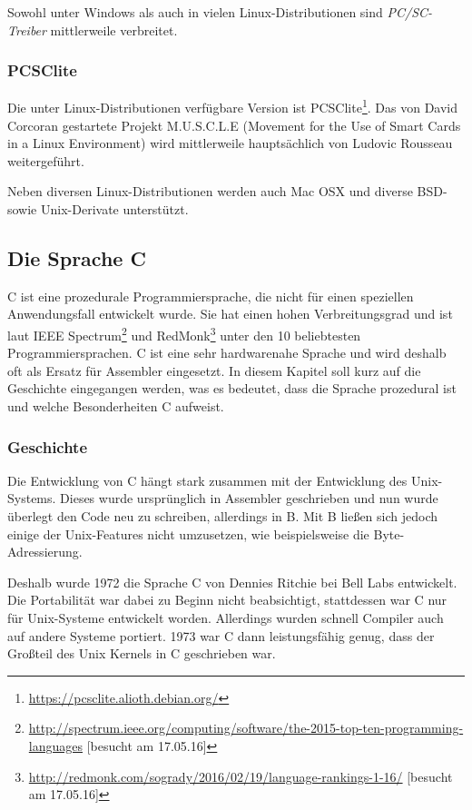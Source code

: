 Sowohl unter Windows als auch in vielen Linux-Distributionen sind
\textit{PC/SC-Treiber} mittlerweile verbreitet.

\subsubsection{PCSClite}
Die unter Linux-Distributionen verfügbare Version ist
PCSClite\footnote{\url{https://pcsclite.alioth.debian.org/}}.
Das von David Corcoran gestartete Projekt M.U.S.C.L.E
(Movement for the Use of Smart Cards in a Linux Environment)
wird mittlerweile hauptsächlich von Ludovic Rousseau
weitergeführt\cite{pcscliteweb}.

Neben diversen Linux-Distributionen werden auch Mac OSX und diverse
BSD- sowie Unix-Derivate unterstützt.

\subsection{Die Sprache C}
 C ist eine prozedurale Programmiersprache, die nicht für einen speziellen
 Anwendungsfall entwickelt wurde. Sie hat einen hohen Verbreitungsgrad
 und ist laut \ac{IEEE} Spectrum\footnote{\url{http://spectrum.ieee.org/computing/software/the-2015-top-ten-programming-languages} [besucht am 17.05.16]}
 und RedMonk\footnote{\url{http://redmonk.com/sogrady/2016/02/19/language-rankings-1-16/} [besucht am 17.05.16]}
 unter den 10 beliebtesten Programmiersprachen. C ist eine sehr hardwarenahe
 Sprache und wird deshalb oft als Ersatz für Assembler eingesetzt. In
 diesem Kapitel soll kurz auf die Geschichte eingegangen werden, was es
 bedeutet, dass die Sprache prozedural ist und welche Besonderheiten C
 aufweist.

 \subsubsection{Geschichte}
  Die Entwicklung von C hängt stark zusammen mit der Entwicklung des Unix-Systems.
  Dieses wurde ursprünglich in Assembler geschrieben und nun wurde
  überlegt den Code neu zu schreiben, allerdings in B. Mit B ließen sich jedoch
  einige der Unix-Features nicht umzusetzen, wie beispielsweise die Byte-Adressierung.
  
  Deshalb wurde 1972 die Sprache C von Dennies Ritchie bei Bell Labs entwickelt. Die Portabilität war
  dabei zu Beginn nicht beabsichtigt, stattdessen war C nur für Unix-Systeme entwickelt
  worden. Allerdings wurden schnell Compiler auch auf andere Systeme portiert. 1973
  war C dann leistungsfähig genug, dass der Großteil des Unix Kernels in C geschrieben war.
  
